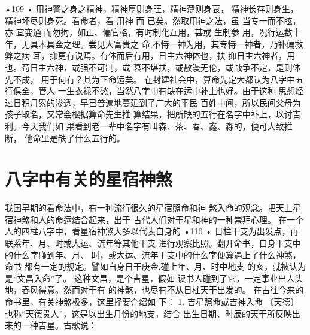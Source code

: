 •109 •
用神警之身之精神，精神厚则身旺，精神薄则身衰，
精神长存则身生，精神坏尽则身死。看命者，看 用神
而 已矣。然取用神之法，虽 当专一而不眩，亦 宜变通
而勿拘，如正、偏官格，有时制化互用，甚或 生制参
用，况行运数十年，无具木具金之理。尝见大富贵之
命,不恃一神为用，其专恃一神者，乃补偏救弊之病
耳，抑更有说焉。有体而后有用，日主六神体也，扶
抑日主六神者，用 也。苟日主六神，或强不可制，或
衰不堪扶，或散漫无伦，或战争不定，是则体先不成，
用于何有？其为下命运矣。
在封建社会中，算命先定大都认为八字中五行俱全，管人
一生衣禄不愁，当然八字中有缺在运中补上也好。由于这种
思想经过日积月累的渗透，早已普遍地蔓延到了广大的平民
百姓中间，所以民间父母为孩子取名，又常会根据算命先生推
算结果，把所缺的五行在名字中补上，以讨吉利。今天我们如
果看到老一辈中名字有叫森、茶、春、鑫、淼的，便可大致推断，
他命里是缺了什么五行的。

\section{八字中有关的星宿神煞}
我国早期的看命法中，有一种流行很久的星宿照命和神
煞入命的观念。把天上星宿神煞和人的命运结合起来，出于
古代人们对于星和神的一种崇拜心理。
在一个人的四柱八字中，看星宿神煞大多以代表自身的
•110 •
日柱干支为出发点，再联系年、月、时或大运、流年等其他干支
进行观察比照。翻开命书，自身干支中的什么字碰到年、月、
时，或大运、流年干支中的什么字便算遇上了什么神煞，命书
都有一定的规定。譬如自身日干庚金,碰上年、月、时中地支
的亥，就被认为是“文昌入命”了。 这种文昌，是个吉星，假如
读书人碰到了它，一定事业出人头地，春风得意。然而对于有
的神煞，也尽有不从日柱天干出发的。
在古往今来的命书里，有关神煞极多，这里择要介绍如
下：
1. 吉星照命或吉神入命
〔天德〕 也称“天德贵人”，这是以出生月份的地支，结合
出生日期、时辰的天干所反映出来的一种吉星。古歌说：


